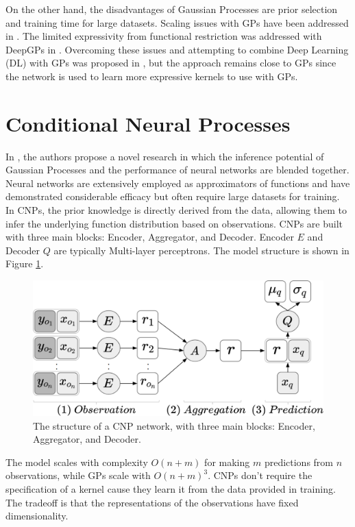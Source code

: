On the other hand, the disadvantages of Gaussian Processes are prior selection and training time for large datasets. Scaling issues with GPs have been addressed in \cite{snelson2006sparse}. The limited expressivity from functional restriction was addressed with DeepGPs in \cite{damianou2013deep}  \cite{salimbeni2017doubly}. Overcoming these issues and attempting to combine Deep Learning (DL) with GPs was proposed in \cite{wilson2016deep}, but the approach remains close to GPs since the network is used to learn more expressive kernels to use with GPs.

\section{Conditional Neural Processes}
In \cite{DBLP:journals/corr/abs-1807-01613}, the authors propose a novel research in which the inference potential of Gaussian Processes and the performance of neural networks are blended together. Neural networks are extensively employed as approximators of functions and have demonstrated considerable efficacy but often require large datasets for training. In CNPs, the prior knowledge is directly derived from the data, allowing them to infer the underlying function distribution based on observations. CNPs are built with three main blocks: Encoder, Aggregator, and Decoder. Encoder $E$ and Decoder $Q$ are typically Multi-layer perceptrons. The model structure is shown in Figure \ref{fig:cnp}. 
\begin{figure}
	\centering
	\includegraphics[width=0.5\linewidth]{Images/CNP.png}
	\caption{The structure of a CNP network, with three main blocks: Encoder, Aggregator, and Decoder.}
	\label{fig:cnp}
\end{figure}
The model scales with complexity $O(n+m)$ for making $m$ predictions from $n$ observations, while GPs scale with $O(n+m)^3$. CNPs don't require the specification of a kernel cause they learn it from the data provided in training. The tradeoff is that the representations of the observations have fixed dimensionality.

